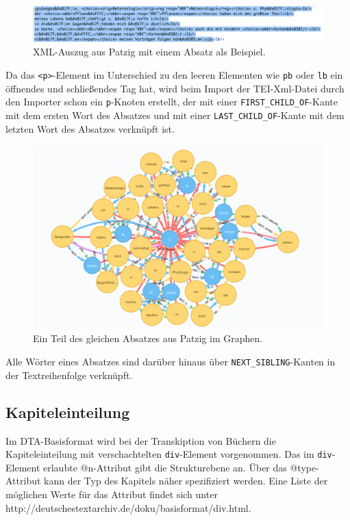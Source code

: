 \documentclass[ngerman,]{scrreprt}
\begin{document}
\begin{figure}
\centering
\includegraphics{Bilder/TEI2Graph/p-xml-Beispiel.png}
\caption{XML-Auszug aus Patzig mit einem Absatz als Beispiel.}
\end{figure}

Da das \texttt{\textless{}p\textgreater{}}-Element im Unterschied zu den leeren Elementen wie \texttt{pb} oder \texttt{lb} ein öffnendes und schließendes Tag hat, wird beim Import der TEI-Xml-Datei durch den Importer schon ein \texttt{p}-Knoten erstellt, der mit einer \texttt{FIRST\_CHILD\_OF}-Kante mit dem ersten Wort des Absatzes und mit einer \texttt{LAST\_CHILD\_OF}-Kante mit dem letzten Wort des Absatzes verknüpft ist.

\begin{figure}
\centering
\includegraphics{Bilder/TEI2Graph/p-graph-Beispiel.png}
\caption{Ein Teil des gleichen Absatzes aus Patzig im Graphen.}
\end{figure}

Alle Wörter eines Absatzes sind darüber hinaus über \texttt{NEXT\_SIBLING}-Kanten in der Textreihenfolge verknüpft.

\subsection{Kapiteleinteilung}\label{kapiteleinteilung}

Im DTA-Basisformat wird bei der Transkiption von Büchern die Kapiteleinteilung mit verschachtelten \texttt{div}-Element vorgenommen. Das im \texttt{div}-Element erlaubte @n-Attribut gibt die Strukturebene an. Über das @type-Attribut kann der Typ des Kapitels näher spezifiziert werden. Eine Liste der möglichen Werte für das Attribut findet sich unter http://deutschestextarchiv.de/doku/basisformat/div.html.
\end{document}
